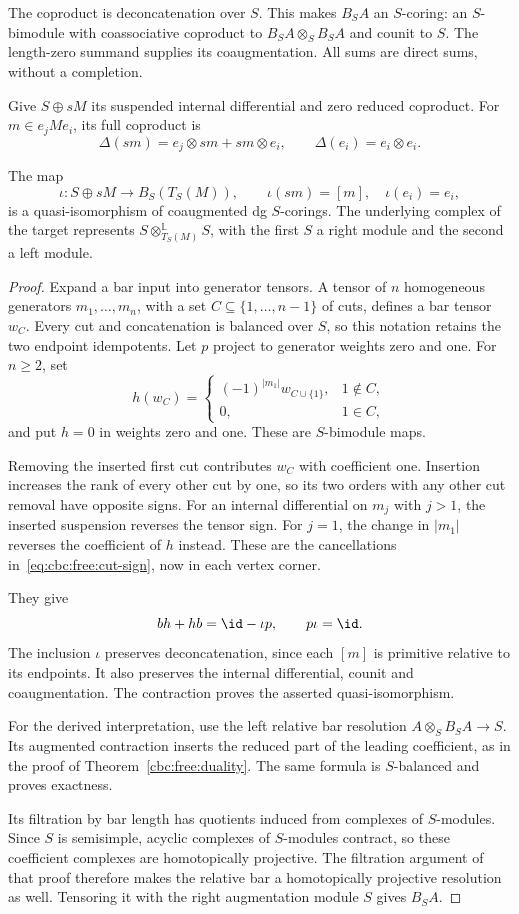 The coproduct is deconcatenation over $S$.
This makes $B_SA$ an $S$-coring: an $S$-bimodule with coassociative coproduct to $B_SA\otimes_S B_SA$ and counit to $S$.
The length-zero summand supplies its coaugmentation.
All sums are direct sums, without a completion.

Give $S\oplus sM$ its suspended internal differential and zero reduced coproduct.
For $m\in e_jMe_i$, its full coproduct is
\[
 \Delta(sm)=e_j\otimes sm+sm\otimes e_i,
 \qquad \Delta(e_i)=e_i\otimes e_i.
\]

\begin{theorem}\label{cbc:quiver:free-bar}
The map
\[
 \iota:S\oplus sM\longrightarrow B_S(T_S(M)),\qquad
 \iota(sm)=[m],\quad \iota(e_i)=e_i,
\]
is a quasi-isomorphism of coaugmented dg $S$-corings.
The underlying complex of the target represents $S\otimes^{\mathbb L}_{T_S(M)}S$, with the first $S$ a right module and the second a left module.
\end{theorem}
\begin{proof}
Expand a bar input into generator tensors.
A tensor of $n$ homogeneous generators $m_1,\ldots,m_n$, with a set $C\subseteq\{1,\ldots,n-1\}$ of cuts, defines a bar tensor $w_C$.
Every cut and concatenation is balanced over $S$, so this notation retains the two endpoint idempotents.
Let $p$ project to generator weights zero and one.
For $n\ge2$, set
\[
 h(w_C)=
 \begin{cases}
 (-1)^{|m_1|}w_{C\cup\{1\}},&1\notin C,\\
 0,&1\in C,
 \end{cases}
\]
and put $h=0$ in weights zero and one.
These are $S$-bimodule maps.

Removing the inserted first cut contributes $w_C$ with coefficient one.
Insertion increases the rank of every other cut by one, so its two orders with any other cut removal have opposite signs.
For an internal differential on $m_j$ with $j>1$, the inserted suspension reverses the tensor sign.
For $j=1$, the change in $|m_1|$ reverses the coefficient of $h$ instead.
These are the cancellations in~\eqref{eq:cbc:free:cut-sign}, now in each vertex corner.

They give
\[
 bh+hb=\id-\iota p,\qquad p\iota=\id.
\]
The inclusion $\iota$ preserves deconcatenation, since each $[m]$ is primitive relative to its endpoints.
It also preserves the internal differential, counit and coaugmentation.
The contraction proves the asserted quasi-isomorphism.

For the derived interpretation, use the left relative bar resolution $A\otimes_S B_SA\to S$.
Its augmented contraction inserts the reduced part of the leading coefficient, as in the proof of Theorem~\ref{cbc:free:duality}.
The same formula is $S$-balanced and proves exactness.

Its filtration by bar length has quotients induced from complexes of $S$-modules.
Since $S$ is semisimple, acyclic complexes of $S$-modules contract, so these coefficient complexes are homotopically projective.
The filtration argument of that proof therefore makes the relative bar a homotopically projective resolution as well.
Tensoring it with the right augmentation module $S$ gives $B_SA$.
\end{proof}

